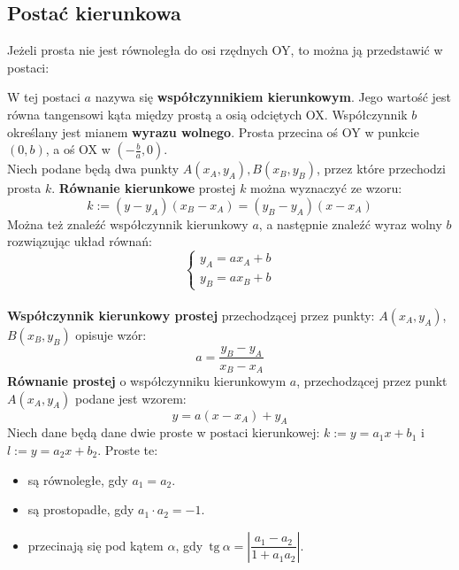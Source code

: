 \documentclass[14pt,a4paper]{extarticle}
\newcommand{\scalemath}[2][4]{\scalebox{#1}{\ensuremath{#2}}}
\newcommand{\verts}[1]{\left\lvert#1\right\rvert}
\newcommand{\tg}{\,\text{tg}\:}
\begin{document}
\subsection*{Postać kierunkowa}
Jeżeli prosta nie jest równoległa do osi rzędnych OY, to można ją przedstawić w postaci:
\begin{center}\scalemath[1.4]{$$y = ax + b;\;\; a, b \in \mathbb{R}$$}\end{center}
\noindent W tej postaci $a$ nazywa się \textbf{współczynnikiem kierunkowym}. Jego wartość jest równa
tangensowi kąta między prostą a osią odciętych OX. Współczynnik $b$ określany jest mianem \textbf{wyrazu wolnego}.
Prosta przecina oś OY w punkcie $(0, b)$, a oś OX w $(-\frac{b}{a}, 0)$.\\

\noindent Niech podane będą dwa punkty $A(x_{A}, y_{A}), B(x_{B}, y_{B})$, przez które przechodzi prosta $k$. \textbf{Równanie kierunkowe} prostej
$k$ można wyznaczyć ze wzoru:
$$k:=(y - y_{A})(x_{B}-x_{A}) = (y_{B}-y_{A})(x - x_{A})$$
Można też znaleźć współczynnik kierunkowy $a$, a następnie znaleźć wyraz wolny $b$ rozwiązując układ równań:
\begin{equation*}
   \left\{
      \begin{array}{l}
         y_{A} = ax_{A} + b\\
         y_{B} = ax_{B} + b
      \end{array}
   \right.
   \end{equation*}
\hfill\break\\
\noindent \textbf{Współczynnik kierunkowy prostej} przechodzącej przez punkty: $A(x_{A}, y_{A})$, $B(x_{B}, y_{B})$ opisuje
wzór:
$$a = \dfrac{y_{B}-y_{A}}{x_{B}-x_{A}}$$
\textbf{Równanie prostej} o współczynniku kierunkowym $a$, przechodzącej przez punkt $A(x_{A}, y_{A})$ podane
jest wzorem:
$$y = a(x - x_{A}) + y_{A}$$
\newpage
\noindent Niech dane będą dane dwie proste w postaci kierunkowej: $k\!:=y=a_{1}x+b_{1}$ i $l\!:=y=a_{2}x+b_{2}$.
Proste te:
\begin{itemize}
   \item są równoległe, gdy $a_{1} = a_{2}$.
   \item są prostopadłe, gdy $a_{1}\cdot a_{2} = -1$.
   \item przecinają się pod kątem $\alpha$, gdy $\tg\alpha = \verts{\dfrac{a_{1}-a_{2}}{1+a_{1}a_{2}}}$.
\end{itemize}
\end{document}
